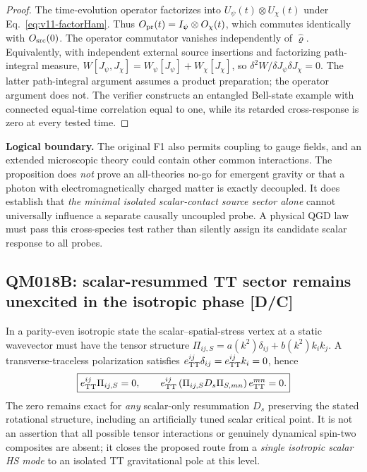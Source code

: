 \documentclass[11pt,a4paper]{article}
\begin{document}
\begin{proof}
The time-evolution operator factorizes into $U_\psi(t)\otimes U_\chi(t)$ under Eq.~\eqref{eq:v11-factorHam}. Thus $O_{\rm pr}(t)=I_\psi\otimes O_\chi(t)$, which commutes identically with $O_{\rm src}(0)$. The operator commutator vanishes independently of $\hat\varrho$. Equivalently, with independent external source insertions and factorizing path-integral measure, $W[J_\psi,J_\chi]=W_\psi[J_\psi]+W_\chi[J_\chi]$, so $\delta^2W/\delta J_\psi\delta J_\chi=0$. The latter path-integral argument assumes a product preparation; the operator argument does not. The verifier constructs an entangled Bell-state example with connected equal-time correlation equal to one, while its retarded cross-response is zero at every tested time.
\end{proof}
\noindent\textbf{Logical boundary.} The original F1 also permits coupling to gauge fields, and an extended microscopic theory could contain other common interactions. The proposition does \emph{not} prove an all-theories no-go for emergent gravity or that a photon with electromagnetically charged matter is exactly decoupled. It does establish that \emph{the minimal isolated scalar-contact source sector alone} cannot universally influence a separate causally uncoupled probe. A physical QGD law must pass this cross-species test rather than silently assign its candidate scalar response to all probes.

\subsection{QM018B: scalar-resummed TT sector remains unexcited in the isotropic phase [D/C]}\label{sec:v11-TT}
In a parity-even isotropic state the scalar--spatial-stress vertex at a static wavevector must have the tensor structure $\Pi_{ij,S}=a(k^2)\delta_{ij}+b(k^2)k_i k_j$. A transverse-traceless polarization satisfies $e^{ij}_{\rm TT}\delta_{ij}=e^{ij}_{\rm TT}k_i=0$, hence
\begin{equation}\label{eq:v11-ttzero}
\boxed{e^{ij}_{\rm TT}\Pi_{ij,S}=0,\qquad
 e^{ij}_{\rm TT}\left(\Pi_{ij,S}D_s\Pi_{S,mn}\right)e^{mn}_{\rm TT}=0.}
\end{equation}
The zero remains exact for \emph{any} scalar-only resummation $D_s$ preserving the stated rotational structure, including an artificially tuned scalar critical point. It is not an assertion that all possible tensor interactions or genuinely dynamical spin-two composites are absent; it closes the proposed route from a \emph{single isotropic scalar HS mode} to an isolated TT gravitational pole at this level.
\end{document}
